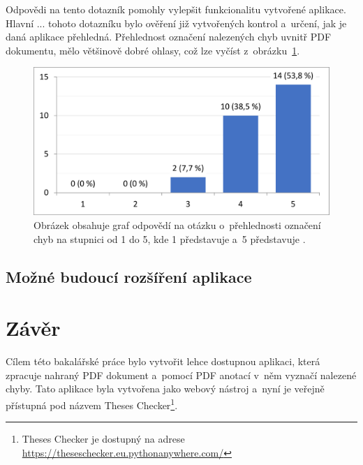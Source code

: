 Odpovědi na tento dotazník pomohly vylepšit funkcionalitu vytvořené aplikace.
Hlavní ... tohoto dotazníku bylo ověření již vytvořených kontrol a~určení,
jak je daná aplikace přehledná. Přehlednost označení nalezených chyb
uvnitř PDF dokumentu, mělo většinově dobré ohlasy, což lze
vyčíst z~obrázku~\ref{rate_checks}.

\begin{figure}[H] \label{rate_checks}
    \centering
    \includegraphics[width=0.8\linewidth]{obrazky-figures/graph1.pdf}
    \caption{Obrázek obsahuje graf odpovědí na otázku o~přehlednosti
    označení chyb na stupnici od 1 do 5, kde 1 představuje 
    a~5 představuje .}
\end{figure}



\section{Možné budoucí rozšíření aplikace}





\chapter{Závěr}
Cílem této bakalářské práce bylo vytvořit lehce dostupnou aplikaci, která zpracuje
nahraný PDF dokument a~pomocí PDF anotací v~něm vyznačí nalezené chyby. Tato
aplikace byla vytvořena jako webový nástroj a~nyní je veřejně
přístupná pod názvem Theses Checker\footnote{Theses Checker je dostupný na adrese
\href{https://theseschecker.eu.pythonanywhere.com/}{https://theseschecker.eu.pythonanywhere.com/}}.

